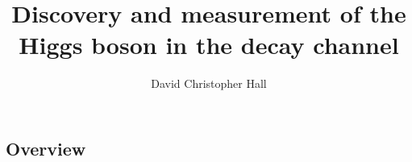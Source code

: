 \documentclass[hyper,allcolors=blue]{mythesis}  %
\title{Discovery and measurement of the Higgs boson in the \WW decay channel}
\author{David Christopher Hall}
\begin{document}
\begin{frontmatter}
  
\end{frontmatter}

\begin{mainmatter}
  \clearpage
  
  \chapter*{Overview}
    \label{chap:intro}
    

  
  
  
  
  
  
  
  
  
  
\end{mainmatter}

\begin{onehalfspacing}
  \cleardoublepage
  
\end{onehalfspacing}
\end{document}
